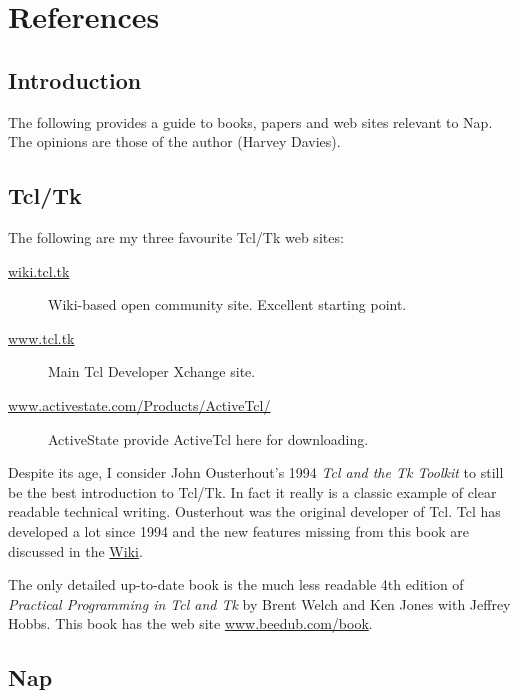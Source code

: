 
\section{References}

\subsection{Introduction}
    \label{refs-Introduction}

The following provides a guide to books, papers and web sites
  relevant to Nap. The opinions are those of the author (Harvey
  Davies).

\subsection{Tcl/Tk}
    \label{refs-tcl}

The following are my three favourite Tcl/Tk web sites:
  \begin{description}
    \item[
      \href{http://wiki.tcl.tk}{wiki.tcl.tk}
    ]
    Wiki-based open community site. Excellent starting point.
    \item[
      \href{http://www.tcl.tk}{www.tcl.tk}
    ]
    Main Tcl Developer Xchange site.
    \item[
      \href{http://www.activestate.com/Products/ActiveTcl/}{www.activestate.com/Products/ActiveTcl/}
    ]
    ActiveState provide ActiveTcl here for downloading.
  \end{description}
  \par Despite its age, I consider John Ousterhout's 1994 
  \emph{Tcl and the Tk Toolkit} to still be the best introduction
  to Tcl/Tk. In fact it really is a classic example of clear readable
  technical writing. Ousterhout was the original developer of Tcl. Tcl
  has developed a lot since 1994 and the new features missing from this
  book are discussed in the 
  \href{http://wiki.tcl.tk/103}{Wiki}.
  \par The only detailed up-to-date book is the much less readable 4th
  edition of 
  \emph{Practical Programming in Tcl and Tk} by Brent Welch and
  Ken Jones with Jeffrey Hobbs. This book has the web site 
  \href{http://www.beedub.com/book}{www.beedub.com/book}.

\subsection{Nap}
    \label{refs-Nap}

